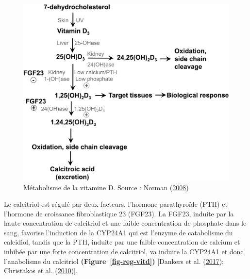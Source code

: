 \documentclass[
  letterpaper,
  DIV=11,
  numbers=noendperiod]{scrartcl}
\begin{document}
\begin{figure}

{\centering \includegraphics{figures/vitamin-d-metabolism.png}

}

\caption{\label{fig-metabolism-vitd}Métabolisme de la vitamine D. Source
: Norman (\protect\hyperlink{ref-Norman.2008}{2008})}

\end{figure}

Le calcitriol est régulé par deux facteurs, l'hormone parathyroïde (PTH)
et l'hormone de croissance fibroblastique 23 (FGF23). La FGF23, induite
par la haute concentration de calcitriol et une faible concentration de
phosphate dans le sang, favorise l'induction de la CYP24A1 qui est
l'enzyme de catabolisme du calcidiol, tandis que la PTH, induite par une
faible concentration de calcium et inhibée par une forte concentration
de calcitriol, va induire la CYP24A1 et donc l'anabolisme du calcitriol
\textbf{(Figure~\ref{fig-reg-vitd})} {[}Dankers et al.
(\protect\hyperlink{ref-Dankers.2017}{2017}); Christakos et al.
(\protect\hyperlink{ref-Christakos.2010}{2010}){]}.
\end{document}
